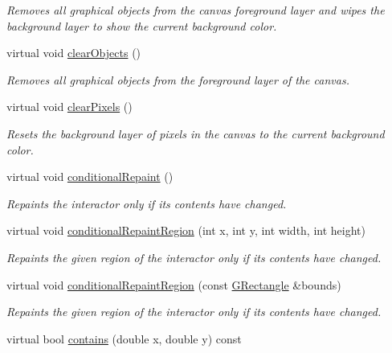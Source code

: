 \begin{DoxyCompactItemize}
\begin{DoxyCompactList}\small\item\em Removes all graphical objects from the canvas foreground layer and wipes the background layer to show the current background color. \end{DoxyCompactList}\item 
virtual void \mbox{\hyperlink{classGCanvas_a6614e1320bc8e93b20df129613e5a0ff}{clear\+Objects}} ()
\begin{DoxyCompactList}\small\item\em Removes all graphical objects from the foreground layer of the canvas. \end{DoxyCompactList}\item 
virtual void \mbox{\hyperlink{classGCanvas_ab2c8590176aec1da6fb4e9b836bab630}{clear\+Pixels}} ()
\begin{DoxyCompactList}\small\item\em Resets the background layer of pixels in the canvas to the current background color. \end{DoxyCompactList}\item 
virtual void \mbox{\hyperlink{classGDrawingSurface_a221b3e75bb3d9d0bfea62b3364e6773b}{conditional\+Repaint}} ()
\begin{DoxyCompactList}\small\item\em Repaints the interactor only if its contents have changed. \end{DoxyCompactList}\item 
virtual void \mbox{\hyperlink{classGDrawingSurface_aedd4b792311d946eeaf44b0de337a408}{conditional\+Repaint\+Region}} (int x, int y, int width, int height)
\begin{DoxyCompactList}\small\item\em Repaints the given region of the interactor only if its contents have changed. \end{DoxyCompactList}\item 
virtual void \mbox{\hyperlink{classGDrawingSurface_a3932a12278752db368e24fa404e446aa}{conditional\+Repaint\+Region}} (const \mbox{\hyperlink{structGRectangle}{G\+Rectangle}} \&bounds)
\begin{DoxyCompactList}\small\item\em Repaints the given region of the interactor only if its contents have changed. \end{DoxyCompactList}\item 
virtual bool \mbox{\hyperlink{classGCanvas_abb6a5d7c03e6eaaae97264c4799ce7c3}{contains}} (double x, double y) const

\end{DoxyCompactItemize}
